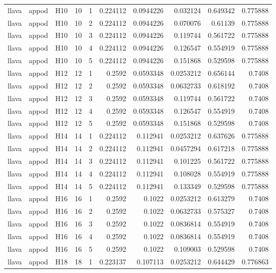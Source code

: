 \begin{longtable}{lllrrrrrrr}
llava & appod & H10 & 10 & 1 & 0.224112 & 0.0944226 & 0.032124 & 0.649342 & 0.775888 \\
llava & appod & H10 & 10 & 2 & 0.224112 & 0.0944226 & 0.070076 & 0.61139 & 0.775888 \\
llava & appod & H10 & 10 & 3 & 0.224112 & 0.0944226 & 0.119744 & 0.561722 & 0.775888 \\
llava & appod & H10 & 10 & 4 & 0.224112 & 0.0944226 & 0.126547 & 0.554919 & 0.775888 \\
llava & appod & H10 & 10 & 5 & 0.224112 & 0.0944226 & 0.151868 & 0.529598 & 0.775888 \\
llava & appod & H12 & 12 & 1 & 0.2592 & 0.0593348 & 0.0253212 & 0.656144 & 0.7408 \\
llava & appod & H12 & 12 & 2 & 0.2592 & 0.0593348 & 0.0632733 & 0.618192 & 0.7408 \\
llava & appod & H12 & 12 & 3 & 0.2592 & 0.0593348 & 0.119744 & 0.561722 & 0.7408 \\
llava & appod & H12 & 12 & 4 & 0.2592 & 0.0593348 & 0.126547 & 0.554919 & 0.7408 \\
llava & appod & H12 & 12 & 5 & 0.2592 & 0.0593348 & 0.151868 & 0.529598 & 0.7408 \\
llava & appod & H14 & 14 & 1 & 0.224112 & 0.112941 & 0.0253212 & 0.637626 & 0.775888 \\
llava & appod & H14 & 14 & 2 & 0.224112 & 0.112941 & 0.0457294 & 0.617218 & 0.775888 \\
llava & appod & H14 & 14 & 3 & 0.224112 & 0.112941 & 0.101225 & 0.561722 & 0.775888 \\
llava & appod & H14 & 14 & 4 & 0.224112 & 0.112941 & 0.108028 & 0.554919 & 0.775888 \\
llava & appod & H14 & 14 & 5 & 0.224112 & 0.112941 & 0.133349 & 0.529598 & 0.775888 \\
llava & appod & H16 & 16 & 1 & 0.2592 & 0.1022 & 0.0253212 & 0.613279 & 0.7408 \\
llava & appod & H16 & 16 & 2 & 0.2592 & 0.1022 & 0.0632733 & 0.575327 & 0.7408 \\
llava & appod & H16 & 16 & 3 & 0.2592 & 0.1022 & 0.0836814 & 0.554919 & 0.7408 \\
llava & appod & H16 & 16 & 4 & 0.2592 & 0.1022 & 0.0836814 & 0.554919 & 0.7408 \\
llava & appod & H16 & 16 & 5 & 0.2592 & 0.1022 & 0.109003 & 0.529598 & 0.7408 \\
llava & appod & H18 & 18 & 1 & 0.223137 & 0.107113 & 0.0253212 & 0.644429 & 0.776863 \\

\end{longtable}
